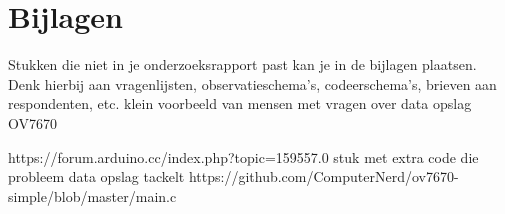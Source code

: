 \documentclass{article}
\begin{document}
\section{Bijlagen}
Stukken die niet in je onderzoeksrapport past kan je in de bijlagen plaatsen. Denk hierbij aan vragenlijsten, observatieschema’s, codeerschema’s, brieven aan respondenten, etc.
klein voorbeeld van mensen met vragen over data opslag OV7670

https://forum.arduino.cc/index.php?topic=159557.0
stuk met extra code die probleem data opslag tackelt
https://github.com/ComputerNerd/ov7670-simple/blob/master/main.c



\end{document}
